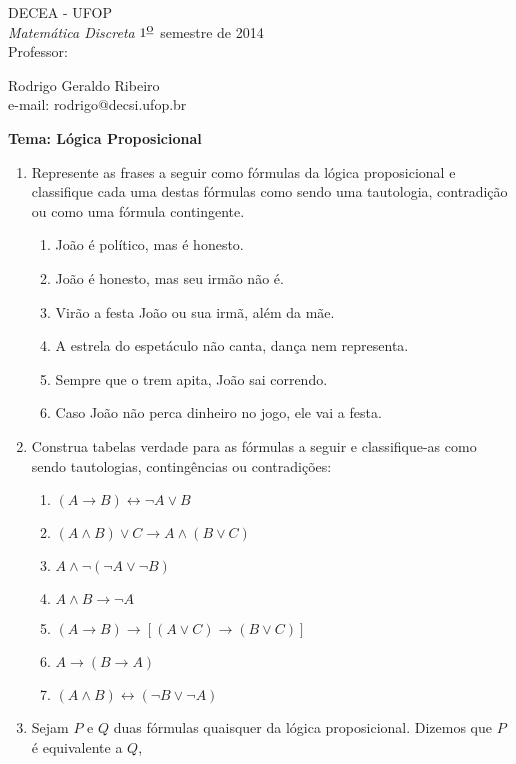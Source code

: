\documentclass[11pt,a4paper]{report}
\begin{document}
 
 \hfill DECEA - UFOP \\
{\it Matem\'atica Discreta}
 \hfill $\mbox{1}^{\mbox{\underline{o}}}$ semestre de 2014 \\
Professor: \parbox[t]{14cm}{Rodrigo Geraldo Ribeiro \\
                     e-mail: rodrigo@decsi.ufop.br}
 
 \hfill {\bf Tema: L\'ogica Proposicional}
 
\vspace*{3mm}
\begin{enumerate}
	\item Represente as frases a seguir como f\'ormulas da l\'ogica
          proposicional e classifique cada uma destas f\'ormulas como sendo
          uma tautologia, contradi\c{c}\~ao ou como uma f\'ormula contingente.
	\begin{enumerate}
		\item Jo\~ao \'e pol\'itico, mas \'e honesto.
		\item Jo\~ao \'e honesto, mas seu irm\~ao n\~ao \'e.
		\item Vir\~ao a festa Jo\~ao ou sua irm\~a, al\'em da m\~ae.
		\item A estrela do espet\'aculo n\~ao canta, dan\c{c}a nem representa.
		\item Sempre que o trem apita, Jo\~ao sai correndo.
		\item Caso Jo\~ao n\~ao perca dinheiro no jogo, ele vai a festa.
	\end{enumerate}
	\item Construa tabelas verdade para as f\'ormulas a seguir e
          classifique-as como sendo tautologias, conting\^encias ou contradi\c{c}\~oes: 
	\begin{enumerate}
		\item $(A\rightarrow B)\leftrightarrow\neg A\lor B$
		\item $(A\land B)\lor C\rightarrow A\land(B\lor C)$
		\item $A\land\neg (\neg A\lor \neg B)$
		\item $A\land B\rightarrow\neg A$
		\item $(A\rightarrow B)\rightarrow[(A\lor C)\rightarrow (B\lor C)]$
		\item $A\rightarrow(B\rightarrow A)$
		\item $(A\land B)\leftrightarrow(\neg B\lor \neg A)$
	\end{enumerate}
	\item Sejam $P$ e $Q$ duas f\'ormulas quaisquer da l\'ogica proposicional. Dizemos que $P$ \'e equivalente a $Q$, 

\end{enumerate}
\end{document}
